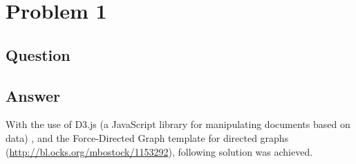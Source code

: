 \section{Problem 1}

\subsection{Question}
\vspace*{10pt}
\justify 


\subsection{Answer}
With the use of D3.js (a JavaScript library for manipulating documents based on data) \cite{d3}, and the Force-Directed Graph template for directed graphs (\url{http://bl.ocks.org/mbostock/1153292}), following solution was achieved.\\

